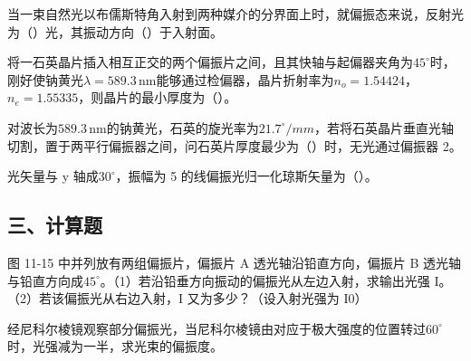 \documentclass[padl, analysis, notocnum]{ExBook}
\newcommand{\answerarea}[1][3.5cm]{%
  \par\vspace{1mm}%
  \noindent{\color{themeColor!35}\rule{\linewidth}{0.4pt}}\par
  \noindent\begin{minipage}[t][#1][t]{\linewidth}\vspace{0pt}\end{minipage}\par
  \noindent{\color{themeColor!35}\rule{\linewidth}{0.4pt}}\par
}
\begin{document}
\begin{qitems}[startnum=17]
\qitem 当一束自然光以布儒斯特角入射到两种媒介的分界面上时，就偏振态来说，反射光为（\hspace{1.6em}）光，其振动方向（\hspace{1.6em}）于入射面。
\label{q:331:start}
\answerarea[4.0cm]
\label{q:331:end}
\end{qitems}

\begin{qitems}[startnum=18]
\qitem 将一石英晶片插入相互正交的两个偏振片之间，且其快轴与起偏器夹角为$45^{\circ}$时，刚好使钠黄光$\lambda =589.3\,\mathrm{nm}$能够通过检偏器，晶片折射率为$n_{o}=1.54424$，$n_{e}=1.55335$，则晶片的最小厚度为（\hspace{1.6em}）。
\label{q:332:start}
\answerarea[4.0cm]
\label{q:332:end}
\end{qitems}

\begin{qitems}[startnum=19]
\qitem 对波长为$589.3\,\mathrm{nm}$的钠黄光，石英的旋光率为$21.7^{\circ}/mm$，若将石英晶片垂直光轴切割，置于两平行偏振器之间，问石英片厚度最少为（\hspace{1.6em}）时，无光通过偏振器 2。
\label{q:333:start}
\answerarea[4.0cm]
\label{q:333:end}
\end{qitems}

\begin{qitems}[startnum=20]
\qitem 光矢量与 y 轴成$30^{\circ}$，振幅为 5 的线偏振光归一化琼斯矢量为（\hspace{1.6em}）。
\label{q:334:start}
\answerarea[4.0cm]
\label{q:334:end}
\end{qitems}

\subsection{三、计算题}
\begin{qitems}[startnum=1]
\qitem 图 11-15 中并列放有两组偏振片，偏振片 A 透光轴沿铅直方向，偏振片 B 透光轴与铅直方向成$45^{\circ}$。（1）若沿铅垂方向振动的偏振光从左边入射，求输出光强 I。（2）若该偏振光从右边入射，I 又为多少？（设入射光强为 I0）
\label{q:335:start}
\answerarea[2.4cm]
\label{q:335:end}
\end{qitems}

\begin{qitems}[startnum=2]
\qitem 经尼科尔棱镜观察部分偏振光，当尼科尔棱镜由对应于极大强度的位置转过$60^{\circ}$时，光强减为一半，求光束的偏振度。
\label{q:336:start}
\answerarea[7.0cm]
\label{q:336:end}
\end{qitems}
\end{document}
